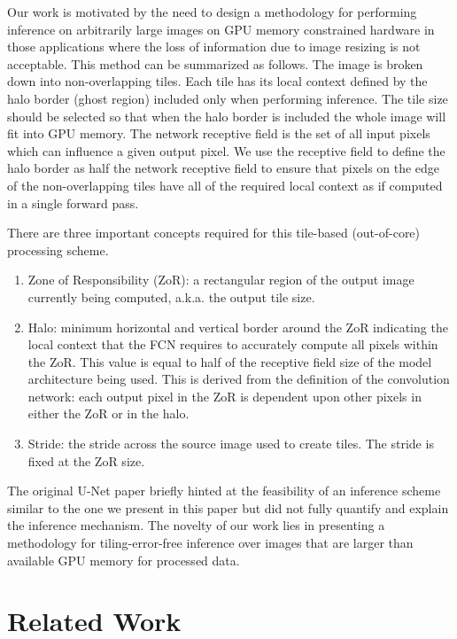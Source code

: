 \documentclass[10pt, indentfirst]{article}
\begin{document}
Our work is motivated by the need to design a methodology for performing inference on arbitrarily large images on GPU memory constrained hardware in those applications where the loss of information due to image resizing is not acceptable. This method can be summarized as follows. 
The image is broken down into non-overlapping tiles. Each tile has its local context defined by the halo border (ghost region) included only when performing inference. The tile size should be selected so that when the halo border is included the whole image will fit into GPU memory. 
The network receptive field \citep{araujo2019computing} is the set of all input pixels which can influence a given output pixel. We use the receptive field to define the halo border as half the network receptive field to ensure that pixels on the edge of the non-overlapping tiles have all of the required local context as if computed in a single forward pass.

There are three important concepts required for this tile-based (out-of-core) processing scheme. 
\begin{enumerate}
	\item Zone of Responsibility (ZoR): a rectangular region of the output image currently being computed, a.k.a. the output tile size.
	\item Halo: minimum horizontal and vertical border around the ZoR indicating the local context that the FCN requires to accurately compute all pixels within the ZoR. This value is equal to half of the receptive field size of the model architecture being used. This is derived from the definition of the convolution network: each output pixel in the ZoR is dependent upon other pixels in either the ZoR or in the halo.
	\item Stride: the stride across the source image used to create tiles. The stride is fixed at the ZoR size.
\end{enumerate}

The original U-Net paper \citep{Ronneberger2015a} briefly hinted at the feasibility of an inference scheme similar to the one we present in this paper but did not fully quantify and explain the inference mechanism. 
The novelty of our work lies in presenting a methodology for tiling-error-free inference over images that are larger than available GPU memory for processed data. 

\section{Related Work}
\label{related-work}
\end{document}
